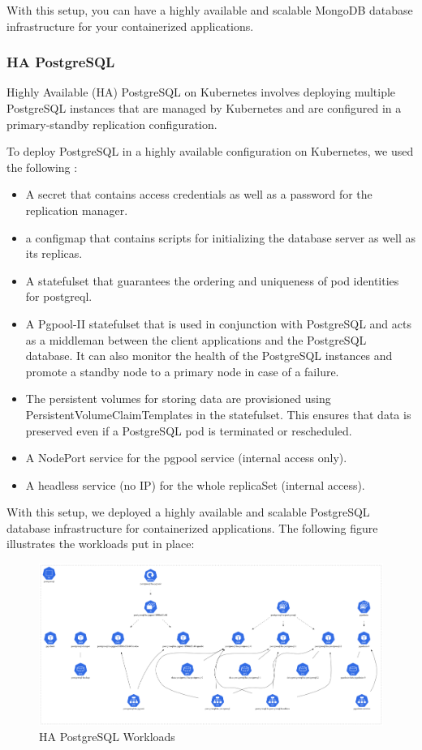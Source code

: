 With this setup, you can have a highly available and scalable MongoDB database infrastructure for your containerized applications. 

 
\subsubsection{HA PostgreSQL }

Highly Available (HA) PostgreSQL on Kubernetes involves deploying multiple PostgreSQL instances that are managed by Kubernetes and are configured in a primary-standby replication configuration.  

To deploy PostgreSQL in a highly available configuration on Kubernetes, we used the following : 
\begin{itemize}[label={--}]
\item A secret that contains access credentials as well as a password for the replication manager. 
\item a configmap that contains scripts for initializing the database server as well as its replicas. 
\item A statefulset that guarantees the ordering and uniqueness of pod identities for postgreql. 
\item A Pgpool-II statefulset that is used in conjunction with PostgreSQL and acts as a middleman between the client applications and the PostgreSQL database. It can also monitor the health of the PostgreSQL instances and promote a standby node to a primary node in case of a failure. 
\item The persistent volumes for storing data are provisioned using PersistentVolumeClaimTemplates in the statefulset. This ensures that data is preserved even if a PostgreSQL pod is terminated or rescheduled. 
\item A NodePort service for the pgpool service (internal access only). 
\item  A headless service (no IP) for the whole replicaSet (internal access). 
\end{itemize}

With this setup, we deployed a highly available and scalable PostgreSQL database infrastructure for containerized applications. The following figure illustrates the workloads put in place: 

\begin{figure}[H]\centering
\includegraphics[width=1.0\textwidth,angle=00]{assets/f37.png}
\caption{HA PostgreSQL Workloads}
\label{fig:f37}
\end{figure}

